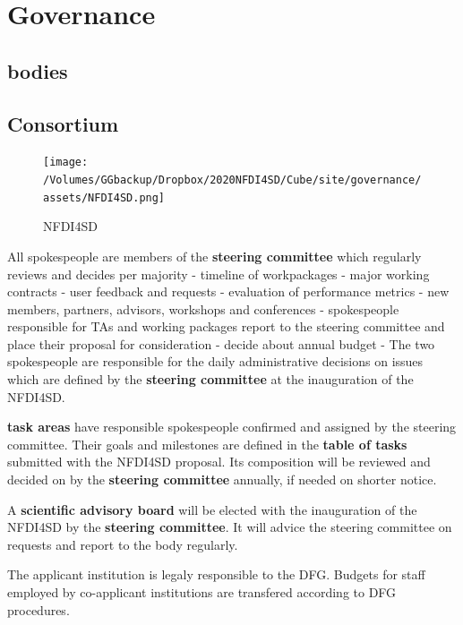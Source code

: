 \documentclass[
  english,
  paper=a4,
  oneside,captions=tableheading
]{scrbook}
\begin{document}
\hypertarget{observablehq-89935fa8}{}

\hypertarget{governance}{%
\chapter{Governance}\label{governance}}

\hypertarget{bodies}{%
\section{bodies}\label{bodies}}

\hypertarget{consortium}{%
\section{Consortium}\label{consortium}}

\begin{figure}
\centering
\texttt{[image: /Volumes/GGbackup/Dropbox/2020NFDI4SD/Cube/site/governance/assets/NFDI4SD.png]}
\caption{NFDI4SD}
\end{figure}

All spokespeople are members of the \textbf{steering committee} which
regularly reviews and decides per majority - timeline of workpackages -
major working contracts - user feedback and requests - evaluation of
performance metrics - new members, partners, advisors, workshops and
conferences - spokespeople responsible for TAs and working packages
report to the steering committee and place their proposal for
consideration - decide about annual budget - The two spokespeople are
responsible for the daily administrative decisions on issues which are
defined by the \textbf{steering committee} at the inauguration of the
NFDI4SD.

\textbf{task areas} have responsible spokespeople confirmed and assigned
by the steering committee. Their goals and milestones are defined in the
\textbf{table of tasks} submitted with the NFDI4SD proposal. Its
composition will be reviewed and decided on by the \textbf{steering
committee} annually, if needed on shorter notice.

A \textbf{scientific advisory board} will be elected with the
inauguration of the NFDI4SD by the \textbf{steering committee}. It will
advice the steering committee on requests and report to the body
regularly.

The applicant institution is legaly responsible to the DFG. Budgets for
staff employed by co-applicant institutions are transfered according to
DFG procedures.
\end{document}
